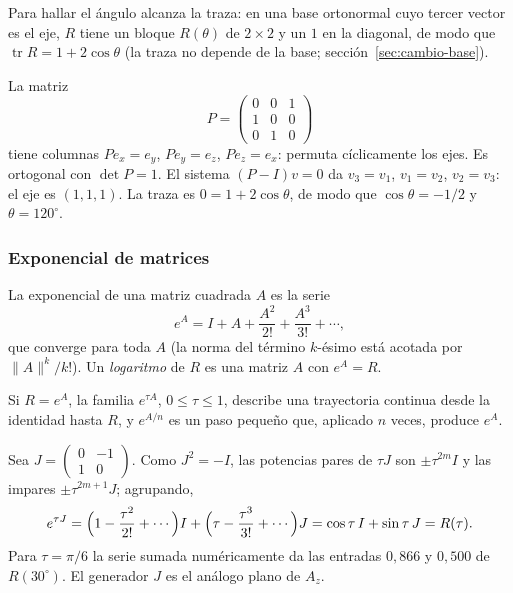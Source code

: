 Para hallar el ángulo alcanza la traza: en una base ortonormal cuyo tercer vector es el eje,
\(R\) tiene un bloque \(R(\theta)\) de \(2\times2\) y un \(1\) en la diagonal, de modo que
\(\operatorname{tr}R=1+2\cos\theta\) (la traza no depende de la base;
sección~\ref{sec:cambio-base}).

\begin{ejemplo}\label{ej:permutacion}
La matriz
\[
P=\begin{pmatrix}0&0&1\\1&0&0\\0&1&0\end{pmatrix}
\]
tiene columnas \(Pe_x=e_y\), \(Pe_y=e_z\), \(Pe_z=e_x\): permuta cíclicamente los ejes. Es
ortogonal con \(\det P=1\). El sistema \((P-I)v=0\) da \(v_3=v_1\), \(v_1=v_2\), \(v_2=v_3\):
el eje es \((1,1,1)\). La traza es \(0=1+2\cos\theta\), de modo que \(\cos\theta=-1/2\) y
\(\theta=120^\circ\).
\end{ejemplo}

\subsubsection{Exponencial de matrices}

\begin{definicion}
La exponencial de una matriz cuadrada \(A\) es la serie
\[
  e^A=I+A+\frac{A^2}{2!}+\frac{A^3}{3!}+\cdots,
\]
que converge para toda \(A\) (la norma del término \(k\)-ésimo está acotada por
\(\|A\|^k/k!\)). Un \emph{logaritmo} de \(R\) es una matriz \(A\) con \(e^A=R\).
\end{definicion}

Si \(R=e^A\), la familia \(e^{\tau A}\), \(0\le\tau\le1\), describe una trayectoria continua
desde la identidad hasta \(R\), y \(e^{A/n}\) es un paso pequeño que, aplicado \(n\) veces,
produce \(e^A\).

\begin{ejemplo}
Sea \(J=\left(\begin{smallmatrix}0&-1\\1&0\end{smallmatrix}\right)\). Como \(J^2=-I\), las potencias pares de
\(\tau J\) son \(\pm\tau^{2m}I\) y las impares \(\pm\tau^{2m+1}J\); agrupando,
\[
e^{\tau J}=\Bigl(1-\frac{\tau^2}{2!}+\cdots\Bigr)I+\Bigl(\tau-\frac{\tau^3}{3!}+\cdots\Bigr)J
=\cos\tau\,I+\sin\tau\,J=R(\tau).
\]
Para \(\tau=\pi/6\) la serie sumada numéricamente da las entradas \(0{,}866\) y \(0{,}500\) de
\(R(30^\circ)\). El generador \(J\) es el análogo plano de \(A_z\).
\end{ejemplo}

